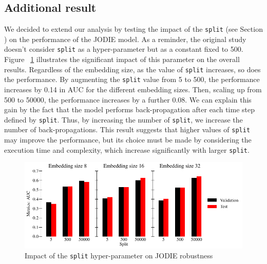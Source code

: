 \subsection{Additional result}
We decided to extend our analysis by testing the impact of the \texttt{split} (see Section ) on the performance of the JODIE model. As a reminder, the original study doesn't consider \texttt{split} as a hyper-parameter but as a constant fixed to 500. 
Figure ~\ref{split} illustrates the significant impact of this parameter on the overall results. Regardless of the embedding size, as the value of \texttt{split} increases, so does the performance. By augmenting the \texttt{split} value from 5 to 500, the performance increases by 0.14 in AUC for the different embedding sizes. Then, scaling up from 500 to 50000, the performance increases by a further 0.08. We can explain this gain by the fact that the model performs back-propagation after each time step defined by \texttt{split}. Thus, by increasing the number of \texttt{split}, we increase the number of back-propagations. This result suggests that higher values of \texttt{split} may improve the performance, but its choice must be made by considering the execution time and complexity, which increase significantly with larger \texttt{split}.

\begin{figure}[htbp]
    \centering
    \includegraphics[width = \textwidth]{image/split.pdf}
    \caption{Impact of the \texttt{split} hyper-parameter on JODIE robustness}
    \label{split}
\end{figure}

